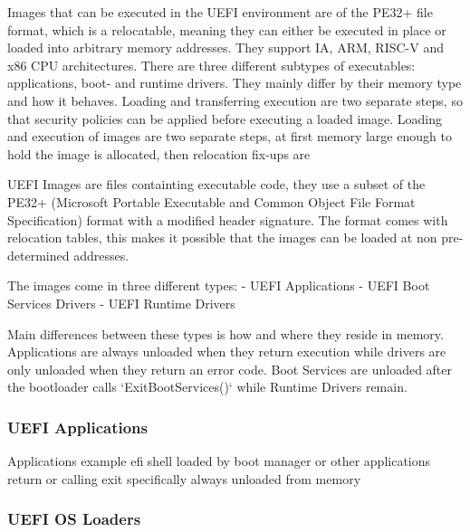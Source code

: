 

Images that can be executed in the \ac{UEFI} environment are of the \ac{PE32}+ file format, which is a relocatable, meaning they can either be executed in place or loaded into arbitrary memory addresses.
They support IA, ARM, RISC-V and x86 CPU architectures.
There are three different subtypes of executables: applications, boot- and runtime drivers. They mainly differ by their memory type and how it behaves. Loading and transferring execution are two separate steps, so that security policies can be applied before executing a loaded image. Loading and execution of images are two separate steps, at first memory large enough to hold the image is allocated, then relocation fix-ups are \cite[2.1.1]{uefi-spec}


UEFI Images are files containting executable code, they use a subset of the PE32+ (Microsoft Portable Executable and Common Object File Format Specification) format with a modified header signature. The format comes with relocation tables, this makes it possible that the images can be loaded at non pre-determined addresses.

The images come in three different types:
- UEFI Applications
- UEFI Boot Services Drivers
- UEFI Runtime Drivers

Main differences between these types is  how and where they reside in memory. Applications are always unloaded when they return execution while drivers are only unloaded when they return an error code. Boot Services are unloaded after the bootloader calls `ExitBootServices()` while Runtime Drivers remain.

\subsubsection{\acs{UEFI} Applications}

Applications
example efi shell
loaded by boot manager or other applications
return or calling exit specifically
always unloaded from memory

\subsubsection{UEFI OS Loaders}

